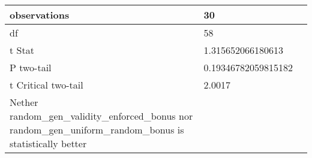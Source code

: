 \documentclass[11pt]{article}
\begin{document}
\begin{table}[H]
{\begin{tabular}{|l|l|l|}
    observations                                                                                                  & 30                                  &                                        \\ \hline
    df                                                                                                            & 58                                  &                                        \\ \hline
    t Stat                                                                                                        & 1.315652066180613                   &                                        \\ \hline
    P two-tail                                                                                                    & 0.19346782059815182                 &                                        \\ \hline
    t Critical two-tail                                                                                           & 2.0017                              &                                        \\ \hline
    Nether random\_gen\_validity\_enforced\_bonus nor random\_gen\_uniform\_random\_bonus is statistically better &                                     &                                        \\ \hline
    \end{tabular}%
    }
\end{table}
\end{document}
